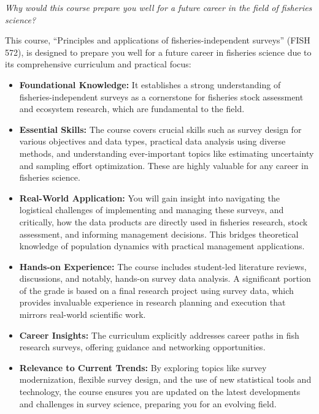 \documentclass[
  letterpaper,
  oneside,
  open=any]{scrbook}
\providecommand{\tightlist}{%
  \setlength{\itemsep}{0pt}\setlength{\parskip}{0pt}}\usepackage{longtable,booktabs,array}
\begin{document}
\emph{Why would this course prepare you well for a future career in the
field of fisheries science?}

This course, ``Principles and applications of fisheries-independent
surveys'' (FISH 572), is designed to prepare you well for a future
career in fisheries science due to its comprehensive curriculum and
practical focus:

\begin{itemize}
\tightlist
\item
  \textbf{Foundational Knowledge:} It establishes a strong understanding
  of fisheries-independent surveys as a cornerstone for fisheries stock
  assessment and ecosystem research, which are fundamental to the field.
\item
  \textbf{Essential Skills:} The course covers crucial skills such as
  survey design for various objectives and data types, practical data
  analysis using diverse methods, and understanding ever-important
  topics like estimating uncertainty and sampling effort optimization.
  These are highly valuable for any career in fisheries science.
\item
  \textbf{Real-World Application:} You will gain insight into navigating
  the logistical challenges of implementing and managing these surveys,
  and critically, how the data products are directly used in fisheries
  research, stock assessment, and informing management decisions. This
  bridges theoretical knowledge of population dynamics with practical
  management applications.
\item
  \textbf{Hands-on Experience:} The course includes student-led
  literature reviews, discussions, and notably, hands-on survey data
  analysis. A significant portion of the grade is based on a final
  research project using survey data, which provides invaluable
  experience in research planning and execution that mirrors real-world
  scientific work.
\item
  \textbf{Career Insights:} The curriculum explicitly addresses career
  paths in fish research surveys, offering guidance and networking
  opportunities.
\item
  \textbf{Relevance to Current Trends:} By exploring topics like survey
  modernization, flexible survey design, and the use of new statistical
  tools and technology, the course ensures you are updated on the latest
  developments and challenges in survey science, preparing you for an
  evolving field.
\end{itemize}
\end{document}
